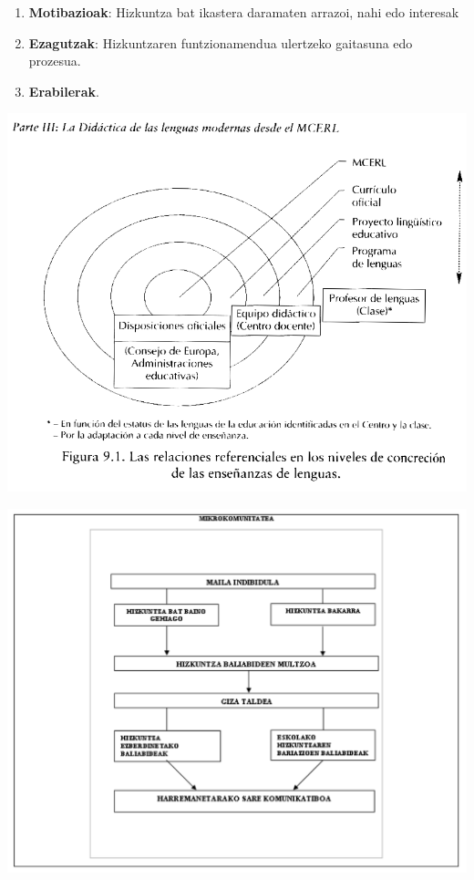 \documentclass[
]{book}
\begin{document}
\begin{enumerate}
\def\labelenumi{\arabic{enumi}.}
\item
  \textbf{Motibazioak}: Hizkuntza bat ikastera daramaten arrazoi, nahi edo interesak
\item
  \textbf{Ezagutzak}: Hizkuntzaren funtzionamendua ulertzeko gaitasuna edo prozesua.
\item
  \textbf{Erabilerak}.
\end{enumerate}

\includegraphics{assets/01_01-HD.png}

\includegraphics{assets/01_02-HD.png}
\end{document}
